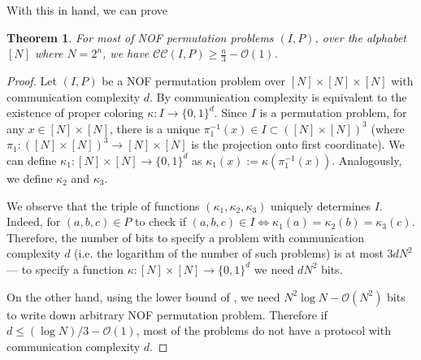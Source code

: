 \documentclass[10pt,a4paper]{article}
\newtheorem{theorem}{Theorem}
\newcommand{\Oh}{\mathcal{O}}
\newcommand{\cc}{\mathcal{CC}}
\begin{document}
With this in hand, we can prove
\begin{theorem}
For most of NOF permutation problems $(I, P)$, over the alphabet $[N]$ where $N = 2^n$, we have $\cc(I,P) \geq \frac{n}{3} - \Oh(1)$.
\end{theorem}
\begin{proof}
Let $(I, P)$ be a NOF permutation problem over $[N] \times [N] \times [N]$ with communication complexity $d$. By  communication complexity is equivalent to the existence of proper coloring $\kappa : I \to \{0, 1\}^d$. Since $I$ is a permutation problem, for any $x \in [N] \times [N]$, there is a unique $\pi_1^{-1}(x) \in I \subset ([N] \times [N])^3$ (where $\pi_1 : ([N] \times [N])^3 \to [N] \times [N]$ is the projection onto first coordinate). We can define $\kappa_1 : [N] \times [N] \to \{0, 1\}^d$ as $\kappa_1(x) := \kappa(\pi_1^{-1}(x))$. Analogously, we define $\kappa_2$ and $\kappa_3$.

We observe that the triple of functions $(\kappa_1, \kappa_2, \kappa_3)$ uniquely determines $I$. Indeed, for $(a,b,c) \in P$ to check if $(a,b,c) \in I \iff \kappa_1(a) = \kappa_2(b) = \kappa_3(c)$. Therefore, the number of bits to specify a problem with communication complexity $d$ (i.e. the logarithm of the number of such problems) is at most $3 d N^2$ --- to specify a function $\kappa : [N] \times [N] \to \{0,1\}^d$ we need $d N^2$ bits.

On the other hand, using the lower bound of , we need $N^2 \log N - \Oh(N^2)$ bits to write down arbitrary NOF permutation problem. Therefore if $d \leq (\log N) / 3 - \Oh(1)$, most of the problems do not have a protocol with communication complexity $d$.
\end{proof}
\end{document}
